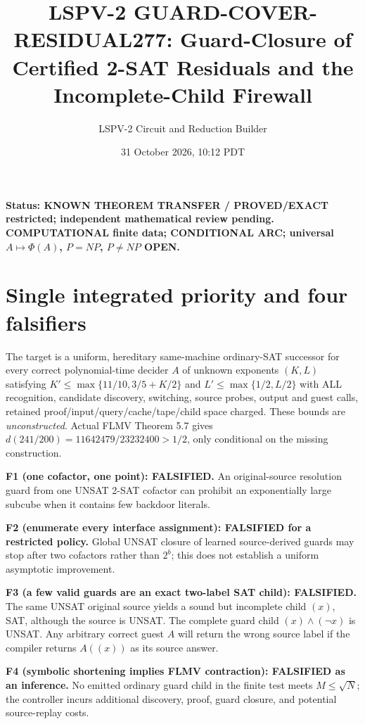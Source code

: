 \documentclass[11pt]{article}
\title{LSPV-2 GUARD-COVER-RESIDUAL277: Guard-Closure of Certified 2-SAT Residuals and the Incomplete-Child Firewall}
\author{LSPV-2 Circuit and Reduction Builder}
\date{31 October 2026, 10:12 PDT}
\begin{document}
\maketitle
\noindent\textbf{Status: KNOWN THEOREM TRANSFER / PROVED/EXACT restricted; independent mathematical review pending. COMPUTATIONAL finite data; CONDITIONAL ARC; universal $A\mapsto\Phi(A)$, $P=NP$, $P\ne NP$ OPEN.}
\section{Single integrated priority and four falsifiers}
The target is a uniform, hereditary same-machine ordinary-SAT successor for every correct polynomial-time decider $A$ of unknown exponents $(K,L)$ satisfying $K'\le\max\{11/10,3/5+K/2\}$ and $L'\le\max\{1/2,L/2\}$ with ALL recognition, candidate discovery, switching, source probes, output and guest calls, retained proof/input/query/cache/tape/child space charged. These bounds are \emph{unconstructed}. Actual FLMV Theorem 5.7 gives $d(241/200)=11642479/23232400>1/2$, only conditional on the missing construction.

\noindent\textbf{F1 (one cofactor, one point): FALSIFIED.} An original-source resolution guard from one UNSAT 2-SAT cofactor can prohibit an exponentially large subcube when it contains few backdoor literals.

\noindent\textbf{F2 (enumerate every interface assignment): FALSIFIED for a restricted policy.} Global UNSAT closure of learned source-derived guards may stop after two cofactors rather than $2^b$; this does not establish a uniform asymptotic improvement.

\noindent\textbf{F3 (a few valid guards are an exact two-label SAT child): FALSIFIED.} The same UNSAT original source yields a sound but incomplete child $(x)$, SAT, although the source is UNSAT. The complete guard child $(x)\wedge(\neg x)$ is UNSAT. Any arbitrary correct guest $A$ will return the wrong source label if the compiler returns $A((x))$ as its source answer.

\noindent\textbf{F4 (symbolic shortening implies FLMV contraction): FALSIFIED as an inference.} No emitted ordinary guard child in the finite test meets $M\le\sqrt N$; the controller incurs additional discovery, proof, guard closure, and potential source-replay costs.
\end{document}
